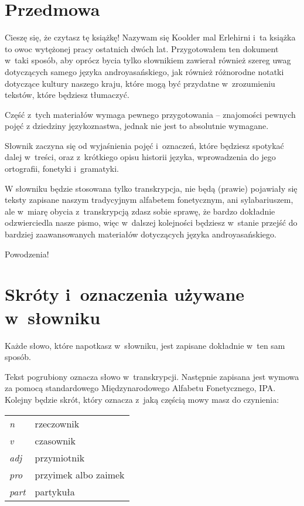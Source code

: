 \newpage

\section{Przedmowa}

\begin{spacing}{1.1}

Cieszę się, że czytasz tę książkę! Nazywam się Koolder mal Erlehirni i~ta książka
to owoc wytężonej pracy ostatnich dwóch lat. Przygotowałem ten dokument w~taki 
sposób, aby oprócz bycia tylko słownikiem zawierał również szereg uwag dotyczących 
samego języka androyasańskiego, jak również różnorodne notatki dotyczące kultury
 naszego kraju, które mogą być przydatne w~zrozumieniu tekstów, które będziesz 
 tłumaczyć.

Część z~tych materiałów wymaga pewnego przygotowania -- znajomości pewnych pojęć
z dziedziny językoznastwa, jednak nie jest to absolutnie wymagane.

Słownik zaczyna się od wyjaśnienia pojęć i~oznaczeń, które będziesz spotykać
dalej w~treści, oraz z~krótkiego opisu historii języka, wprowadzenia do jego 
ortografii, fonetyki i~gramatyki.

W słowniku będzie stosowana tylko transkrypcja, nie będą (prawie) pojawiały się
teksty zapisane naszym tradycyjnym alfabetem fonetycznym, ani sylabariuszem, ale
w~miarę obycia z~transkrypcją zdasz sobie sprawę, że bardzo dokładnie 
odzwierciedla nasze pismo, więc w~dalszej kolejności będziesz w~stanie przejść 
do bardziej zaawansowanych materiałów dotyczących języka androyasańskiego.

\bigskip

Powodzenia!

\section[Skróty i~oznaczenia]{Skróty i~oznaczenia używane w~słowniku}

Każde słowo, które napotkasz w~słowniku, jest zapisane dokładnie w~ten sam sposób.

Tekst pogrubiony oznacza słowo w~transkrypcji. Następnie zapisana jest wymowa za pomocą standardowego Międzynarodowego Alfabetu Fonetycznego, IPA. Kolejny będzie skrót, który oznacza z~jaką częścią mowy masz do czynienia:

\begin{table}[h]
\begin{tabular}{ll}
\emph{n}    & rzeczownik           \\
\emph{v}    & czasownik            \\
\emph{adj}  & przymiotnik          \\
\emph{pro}  & przyimek albo zaimek \\
\emph{part} & partykuła           
\end{tabular}
\end{table}


\end{spacing}
